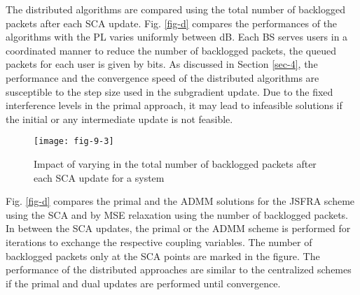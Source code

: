 The distributed algorithms are compared using the total number of backlogged packets after each \ac{SCA} update. Fig. \ref{fig-d} compares the performances of the algorithms with the \ac{PL} varies uniformly between \me{[0,-6]} dB. Each \ac{BS} serves  users in a coordinated manner to reduce the number of backlogged packets,  the queued packets for each user is given by  bits. As discussed in Section \ref{sec-4}, the performance and the convergence speed of the distributed algorithms are susceptible to the step size used in the subgradient update. Due to the fixed interference levels in the primal approach, it may lead to infeasible solutions if the initial or any intermediate update is not feasible.
\begin{figure}
	\centering
	\texttt{[image: fig-9-3]}
	\caption{Impact of varying  in the total number of backlogged packets after each \ac{SCA} update for a system }
	\label{fig-d-3.1}
\end{figure}

Fig. \ref{fig-d} compares the primal and the \ac{ADMM} solutions for the \ac{JSFRA} scheme using the \ac{SCA} and by \ac{MSE} relaxation using the number of backlogged packets. In between the \ac{SCA} updates, the primal or the \ac{ADMM} scheme is performed for  iterations to exchange the respective coupling variables. The number of backlogged packets only at the \ac{SCA} points are marked in the figure. The performance of the distributed approaches are similar to the centralized schemes if the primal and dual updates are performed until convergence. %

